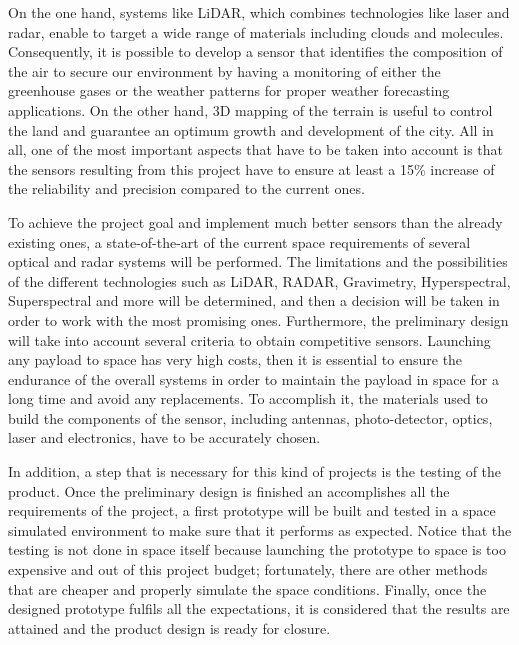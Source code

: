 On the one hand, systems like LiDAR, which combines technologies like laser and radar, enable to target a wide range of materials including clouds and molecules. Consequently, it is possible to develop a sensor that identifies the composition of the air to secure our environment by having a monitoring of either the greenhouse gases or the weather patterns for proper weather forecasting applications. On the other hand, 3D mapping of the terrain is useful to control the land and guarantee an optimum growth and development of the city. All in all, one of the most important aspects that have to be taken into account is that the sensors resulting from this project have to ensure at least a 15\% increase of the reliability and precision compared to the current ones.

To achieve the project goal and implement much better sensors than the already existing ones, a state-of-the-art of the current space requirements of several optical and radar systems will be performed. The limitations and the possibilities of the different technologies such as LiDAR, RADAR, Gravimetry, Hyperspectral, Superspectral and more will be determined, and then a decision will be taken in order to work with the most promising ones. Furthermore, the preliminary design will take into account several criteria to obtain competitive sensors. Launching any payload to space has very high costs, then it is essential to ensure the endurance of the overall systems in order to maintain the payload in space for a long time and avoid any replacements. To accomplish it, the materials used to build the components of the sensor, including antennas, photo-detector, optics, laser and electronics, have to be accurately chosen.

In addition, a step that is necessary for this kind of projects is the testing of the product. Once the preliminary design is finished an accomplishes all the requirements of the project, a first prototype will be built and tested in a space simulated environment to make sure that it performs as expected. Notice that the testing is not done in space itself because launching the prototype to space is too expensive and out of this project budget; fortunately, there are other methods that are cheaper and properly simulate the space conditions. Finally, once the designed prototype fulfils all the expectations, it is considered that the results are attained and the product design is ready for closure.